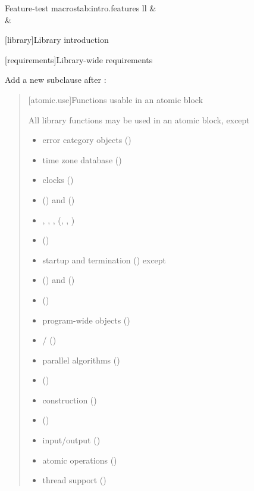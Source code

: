 \setcounter{table}{18}

\begin{floattable}{Feature-test macros}{tab:intro.features}
{ll}
\topline
{} &  \\
\capsep
{}  & \tcode{\tsver} \\
\end{floattable}


[library]{Library introduction}

\setcounter{section}{3}

[requirements]{Library-wide requirements}

\setcounter{subsection}{6}
\setcounter{subsubsection}{16}

Add a new subclause after :

\begin{quote}
[atomic.use]{Functions usable in an atomic block}

\pnum
All library functions may be used in an atomic block, except

\begin{itemize}
\item
  error category objects ()
\item
  time zone database ()
\item
  clocks ()
\item
   () and 
  ()
\item
  , ,
  , 
  (, , )
\item
   ()
\item
  startup and termination () except
\item
   () and
   ()
\item
   ()
\item
  program-wide  objects
  ()
\item
   /  ()
\item
  parallel algorithms ()
\item
   ()
\item
   construction ()
\item
  { ()}
\item
  input/output ()
\item
  atomic operations ()
\item
  thread support ()
\end{itemize}
\end{quote}
